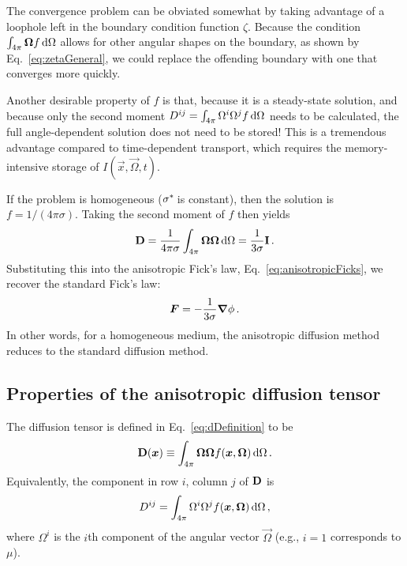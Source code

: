 The convergence problem can be obviated somewhat by taking advantage of a
loophole left in the boundary condition function $\zeta$. Because the condition
$\int_{4\pi} \bm{\Omega} f \mathop{}\!\mathrm{d}\Omega$ allows for other angular shapes on the
boundary, as shown by Eq.~\eqref{eq:zetaGeneral}, we could replace the
offending boundary with one that converges more quickly.

Another desirable property of $f$ is that, because it is a steady-state
solution, and because only the second moment
$D^{ij}=\int_{4\pi} \Omega^i \Omega^j f \mathop{}\!\mathrm{d}\Omega$ needs to be calculated, the
full angle-dependent solution does not need to be stored! This is a tremendous
advantage compared to time-dependent transport, which requires the
memory-intensive storage of $I(\vec{x},\vec{\Omega},t)$.

If the problem is homogeneous ($\sigma^{*\!}$ is constant), then the solution is
$f=1/(4\pi\sigma)$. Taking the second moment of $f$ then yields
\begin{equation*}
  \mathbf{D} = \frac{1}{4\pi\sigma} \int_{4\pi} \bm{\Omega} \bm{\Omega} \mathop{}\!\mathrm{d} \Omega
  = \frac{1}{3\sigma} \mathbf{I}\,.
\end{equation*}
Substituting this into the anisotropic Fick's law,
Eq.~\eqref{eq:anisotropicFicks}, we recover the standard Fick's law:
\begin{equation*}
  \bm{F} = - \frac{1}{3\sigma} \bm{\nabla} \phi\,.
\end{equation*}
In other words, for a homogeneous medium, the anisotropic diffusion method
reduces to the standard diffusion method.

\subsection{Properties of the anisotropic diffusion tensor}
The diffusion tensor is defined in Eq.~\eqref{eq:dDefinition} to be
\begin{equation*}
  \mathbf{D}(\bm{x}) \equiv \int_{4\pi} \bm{\Omega} \bm{\Omega}
  f(\bm{x}, \bm{\Omega}) \mathop{}\!\mathrm{d}\Omega \,.
\end{equation*}
Equivalently, the component in row $i$, column $j$ of $\mathbf{D}$ is
\begin{equation}\label{eq:dij}
  D^{ij} = \int_{4\pi} \Omega^i \Omega^j
  f(\bm{x}, \bm{\Omega}) \mathop{}\!\mathrm{d}\Omega \,,
\end{equation}
where $\Omega^i$ is the $i$th component of the angular vector $\vec{\Omega}$
(e.g., $i=1$ corresponds to $\mu$).

